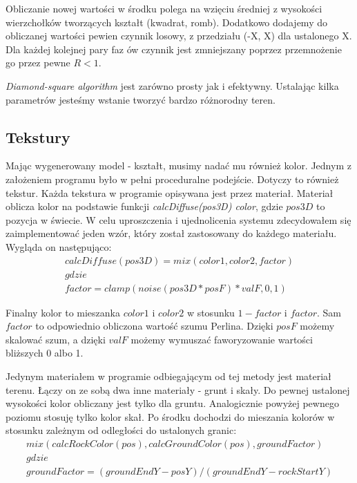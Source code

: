 \documentclass[inz,longabstract]{iithesis}
\begin{document}
            Obliczanie nowej wartości w środku polega na wzięciu średniej z wysokości wierzchołków tworzących kształt (kwadrat, romb). Dodatkowo dodajemy do obliczanej wartości pewien czynnik losowy, z przedziału (-X, X) dla ustalonego X. Dla każdej kolejnej pary faz ów czynnik jest zmniejszany poprzez przemnożenie go przez pewne $R < 1$.
            
            \textit{Diamond-square algorithm} jest zarówno prosty jak i efektywny. Ustalając kilka parametrów jesteśmy wstanie tworzyć bardzo różnorodny teren. 
            
        \subsection{Tekstury}
            Mając wygenerowany model - kształt,  musimy nadać mu również kolor. Jednym z założeniem programu było w pełni proceduralne podejście. Dotyczy to również tekstur. Każda tekstura w programie opisywana jest przez materiał. Materiał oblicza kolor na podstawie funkcji \textit{calcDiffuse(pos3D) \textrightarrow color}, gdzie $pos3D$ to pozycja w świecie. W celu uproszczenia i ujednolicenia systemu zdecydowałem się zaimplementować jeden wzór, który został zastosowany do każdego materiału. Wygląda on następująco:
            \begin{gather*} \label{eqn:material}
                calcDiffuse(pos3D) = mix(color1, color2, factor) \\
                gdzie \\
                factor = clamp(noise(pos3D * posF) * valF, 0, 1)
            \end{gather*}
            

            Finalny kolor to mieszanka $color1$ i $color2$ w stosunku $1 - factor$ i $factor$. Sam $factor$ to odpowiednio obliczona wartość szumu Perlina. Dzięki $posF$ możemy skalować szum, a dzięki $valF$ możemy wymuszać faworyzowanie wartości bliższych 0 albo 1.
            
            Jedynym materiałem w programie odbiegającym od tej metody jest materiał terenu. Łączy on ze sobą dwa inne materiały - grunt i skały. Do pewnej ustalonej wysokości kolor obliczany jest tylko dla gruntu. Analogicznie powyżej pewnego poziomu stosuję tylko kolor skał. Po środku dochodzi do mieszania kolorów w stosunku zależnym od odległości do ustalonych granic:
            \begin{gather*}
            mix(calcRockColor(pos), calcGroundColor(pos), groundFactor) \\
            gdzie \\
            groundFactor = (groundEndY - posY) / (groundEndY - rockStartY) \\
            \end{gather*}
            
\end{document}
